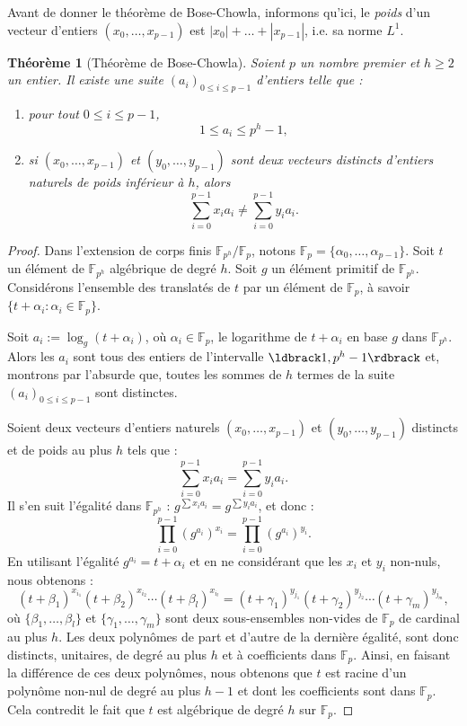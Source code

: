 \documentclass[a4paper, titlepage, 11pt]{article}
\newtheorem{theo}{Théorème}[section]
\theoremstyle{definition}
\theoremstyle{remark}
\def\gf #1{\mathbb{F}_{#1}}
\newcommand{\extension}[2]{{#1} / {#2}} %
\begin{document}
Avant de donner le théorème de Bose-Chowla, informons qu'ici, le \textit{poids} d'un vecteur d'entiers $(x_0, \dots, x_{p-1})$ est $|x_0| + \dots + |x_{p-1}|$, i.e. sa norme $L^1$.

\begin{theo}[Théorème de Bose-Chowla]
Soient $p$ un nombre premier et $h \geqslant 2$ un entier. Il existe une suite ${(a_i)}_{0\leqslant i \leqslant p-1}$ d'entiers telle que : \begin{enumerate}
\item pour tout $0 \leqslant i \leqslant p-1$, $$1 \leqslant a_i \leqslant p^h-1,$$
\item si $(x_0, \dots, x_{p-1})$ et $(y_0, \dots, y_{p-1})$ sont deux vecteurs distincts d'entiers naturels de poids inférieur à $h$, alors
$$\sum_{i=0}^{p-1} x_ia_i \neq \sum_{i=0}^{p-1} y_ia_i.$$
\end{enumerate}
\end{theo}

\begin{proof}
Dans l'extension de corps finis $\extension{\gf{p^h}}{\gf{p}}$, notons $\gf{p} = \{\alpha_0, \dots, \alpha_{p-1} \}$. Soit $t$ un élément de $\gf{p^h}$ algébrique de degré $h$. Soit $g$ un élément primitif de $\gf{p^h}$. Considérons l'ensemble des translatés de $t$ par un élément de $\gf{p}$, à savoir $\{ t + \alpha_i : \alpha_i \in \gf{p} \}$.

Soit $a_i := \log_g(t + \alpha_i)$, où $\alpha_i \in \gf{p}$, le logarithme de $t+\alpha_i$ en base $g$ dans $\gf{p^h}$. Alors les $a_i$ sont tous des entiers de l'intervalle $\ldbrack1, p^h -1\rdbrack$ et, montrons par l'absurde que, toutes les sommes de $h$ termes de la suite ${(a_i)}_{0\leqslant i \leqslant p-1}$ sont distinctes. 

Soient deux vecteurs d'entiers naturels $(x_0, \dots, x_{p-1})$ et $(y_0, \dots, y_{p-1})$ distincts et de poids au plus $h$ tels que :
$$\sum_{i=0}^{p-1}x_ia_i = \sum_{i=0}^{p-1}y_ia_i.$$
Il s'en suit l'égalité dans $\gf{p^h}$ : $g^{\sum x_ia_i} = g^{\sum y_ia_i}$, et donc :
$$\prod_{i=0}^{p-1} {\left({g^{a_i}}\right)}^{x_i} = \prod_{i=0}^{p-1} {\left({g^{a_i}}\right)}^{y_i}.$$
En utilisant l'égalité $g^{a_i} = t + \alpha_i$ et en ne considérant que les $x_i$ et $y_i$ non-nuls, nous obtenons :
$$(t+\beta_1)^{x_{i_1}}(t+\beta_2)^{x_{i_2}} \cdots (t+\beta_l)^{x_{i_l}} = (t+\gamma_1)^{y_{j_1}}(t+\gamma_2)^{y_{j_2}} \cdots (t+\gamma_m)^{y_{j_m}},$$
où $\{\beta_1, \dots, \beta_l \}$ et $\{ \gamma_1, \dots, \gamma_m\}$ sont deux sous-ensembles non-vides de $\gf{p}$ de cardinal au plus $h$. Les deux polynômes de part et d'autre de la dernière égalité, sont donc distincts, unitaires, de degré au plus $h$ et à coefficients dans $\gf{p}$. Ainsi, en faisant la différence de ces deux polynômes, nous obtenons que $t$ est racine d'un polynôme non-nul de degré au plus $h-1$ et dont les coefficients sont dans $\gf{p}$. Cela contredit le fait que $t$ est algébrique de degré $h$ sur $\gf{p}$.
\end{proof}
\end{document}
